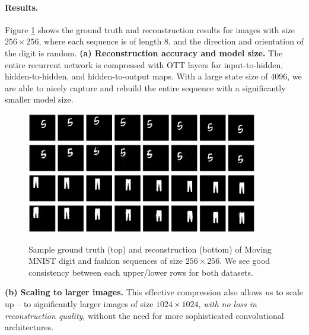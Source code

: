 \paragraph{Results.} Figure \ref{fig:256digits} shows the ground truth and reconstruction
results for images with size $256 \times 256$, where each sequence is of length 8,
and the direction and orientation of the digit is random.
\textbf{(a) Reconstruction accuracy and model size.}
The entire recurrent network is compressed with OTT layers for input-to-hidden, hidden-to-hidden,
and hidden-to-output maps. With a large state size of 4096, we are able to nicely capture and
rebuild the entire sequence with a significantly smaller model size.
\begin{figure}
    \centering
    \includegraphics[width=0.9\textwidth,trim={0 1.5cm 0 1cm},clip]{4_ott/figs/mnist/DMNIST_gt.eps}
    \includegraphics[width=0.9\textwidth,trim={0 1cm 0 1.5cm},clip]{4_ott/figs/mnist/DMNIST_pd.eps}
    \includegraphics[width=0.9\textwidth,trim={0 1.5cm 0 1cm},clip]{4_ott/figs/mnist/FMNIST_gt.eps}
    \includegraphics[width=0.9\textwidth,trim={0 1cm 0 1.5cm},clip]{4_ott/figs/mnist/FMNIST_pd.eps}
    \vspace{-10pt}
    \caption{    \label{fig:256digits} \footnotesize Sample ground truth (top) and reconstruction (bottom) of Moving MNIST digit and fashion sequences of size $256 \times 256$. We
    see good consistency between each upper/lower rows for both datasets.}
\end{figure}
\textbf{(b) Scaling to larger images.}
This effective compression also allows us to scale up --  to
significantly larger images of size $1024 \times 1024$, \textit{with no loss in reconstruction quality},
    without the need for more sophisticated convolutional architectures.

